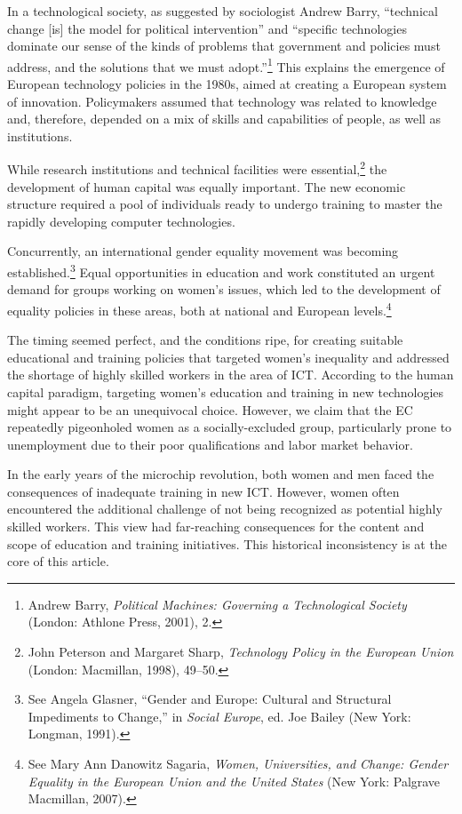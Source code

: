 \documentclass{tufte-handout}
\begin{document}
In a technological society, as suggested by sociologist Andrew Barry,
``technical change {[}is{]} the model for political intervention'' and
``specific technologies dominate our sense of the kinds of problems that
government and policies must address, and the solutions that we must
adopt.''\footnote{Andrew Barry, \emph{Political Machines: Governing a
  Technological Society} (London: Athlone Press, 2001), 2.} This
explains the emergence of European technology policies in the 1980s,
aimed at creating a European system of innovation. Policymakers assumed
that technology was related to knowledge and, therefore, depended on a
mix of skills and capabilities of people, as well as institutions.

While research institutions and technical facilities were
essential,\footnote{John Peterson and Margaret Sharp, \emph{Technology
  Policy in the European Union} (London: Macmillan, 1998), 49--50.} the
development of human capital was equally important. The new economic
structure required a pool of individuals ready to undergo training to
master the rapidly developing computer technologies.

Concurrently, an international gender equality movement was becoming
established.\footnote{See Angela Glasner, ``Gender and Europe: Cultural
  and Structural Impediments to Change,'' in \emph{Social Europe}, ed.
  Joe Bailey (New York: Longman, 1991).} Equal opportunities in
education and work constituted an urgent demand for groups working on
women's issues, which led to the development of equality policies in
these areas, both at national and European levels.\footnote{See Mary Ann
  Danowitz Sagaria, \emph{Women, Universities, and Change: Gender
  Equality in the European Union and the United States} (New York:
  Palgrave Macmillan, 2007).}

The timing seemed perfect, and the conditions ripe, for creating
suitable educational and training policies that targeted women's
inequality and addressed the shortage of highly skilled workers in the
area of ICT. According to the human capital paradigm, targeting women's
education and training in new technologies might appear to be an
unequivocal choice. However, we claim that the EC repeatedly pigeonholed
women as a socially-excluded group, particularly prone to unemployment
due to their poor qualifications and labor market behavior.

In the early years of the microchip revolution, both women and men faced
the consequences of inadequate training in new ICT. However, women often
encountered the additional challenge of not being recognized as
potential highly skilled workers. This view had far-reaching
consequences for the content and scope of education and training
initiatives. This historical inconsistency is at the core of this
article.
\end{document}
